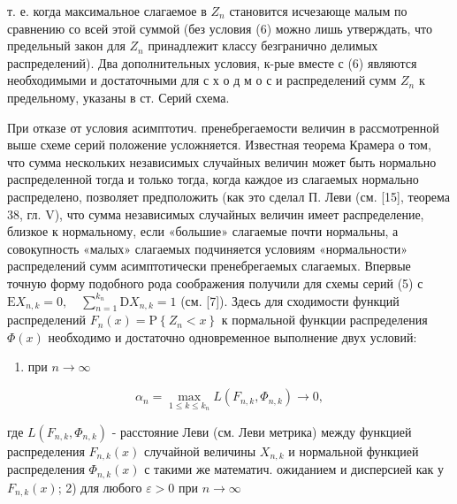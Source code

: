 \documentclass[10pt]{article}
\begin{document}
т. е. когда максимальное слагаемое в $Z_{n}$ становится исчезающе малым по сравнению со всей этой суммой (без условия (6) можно лишь утверждать, что предельный закон для $Z_{n}$ принадлежит классу безгранично делимых распределений). Два дополнительных условия, к-рые вместе с (6) являются необходимыми и достаточными для с х о д м о с и распределений сумм $Z_{n}$ к предельному, указаны в ст. Серий схема.



При отказе от условия асимптотич. пренебрегаемости величин в рассмотренной выше схеме серий положение усложняется. Известная теорема Крамера о том, что сумма нескольких независимых случайных величин может быть нормально распределенной тогда и только тогда, когда каждое из слагаемых нормально распределено, позволяет предположить (как это сделал П. Леви (см. [15], теорема 38, гл. V), что сумма независимых случайных величин имеет распределение, близкое к нормальному, если «большие» слагаемые почти нормальны, а совокупность «малых» слагаемых подчиняется условиям «нормальности» распределений сумм асимптотически пренебрегаемых слагаемых. Впервые точную форму подобного рода соображения получили для схемы серий (5) с $\mathrm{E} X_{n, k}=0, \quad \sum_{n=1}^{k_{n}} \mathrm{D} X_{n, k}=1$ (см. [7]). Здесь для сходимости функций распределений $F_{n}(x)=\mathrm{P}\left\{Z_{n}<x\right\}$ к пормальной функции распределения $\Phi(x)$ необходимо и достаточно одновременное выполнение двух условий:



\begin{enumerate}

  \item при $n \longrightarrow \infty$

\end{enumerate}



\[

\alpha_{n}=\max _{1 \leqslant k \leqslant k_{n}} L\left(F_{n, k}, \Phi_{n, k}\right) \rightarrow 0,

\]



где $L\left(F_{n, k}, \Phi_{n, k}\right)$ - расстояние Леви (см. Леви метрика) между функцией распределения $F_{n, k}(x)$ случайной величины $X_{n, k}$ и нормальной функцией распределения $\Phi_{n, k}(x)$ с такими же математич. ожиданием и дисперсией как у $F_{n, k}(x)$; 2) для любого $\varepsilon>0$ при $n \rightarrow \infty$
\end{document}
